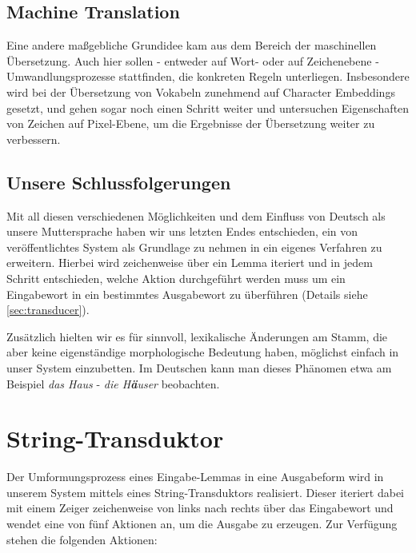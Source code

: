 \documentclass[a4paper]{article}
\begin{document}
\subsection{Machine Translation}
Eine andere maßgebliche Grundidee kam aus dem Bereich der maschinellen Übersetzung. Auch hier sollen - entweder auf Wort- oder auf Zeichenebene - Umwandlungsprozesse stattfinden, die konkreten Regeln unterliegen. Insbesondere wird bei der Übersetzung von Vokabeln zunehmend auf Character Embeddings gesetzt, und \citet{cjk-mt:LiuLLN17} gehen sogar noch einen Schritt weiter und untersuchen Eigenschaften von Zeichen auf Pixel-Ebene, um die Ergebnisse der Übersetzung weiter zu verbessern.

\subsection{Unsere Schlussfolgerungen}
Mit all diesen verschiedenen Möglichkeiten und dem Einfluss von Deutsch als unsere Muttersprache haben wir uns letzten Endes entschieden, ein von \citet{cluzh:MakarovRC17} veröffentlichtes System als Grundlage zu nehmen in ein eigenes Verfahren zu erweitern.
Hierbei wird zeichenweise über ein Lemma iteriert und in jedem Schritt entschieden, welche Aktion durchgeführt werden muss um ein Eingabewort in ein bestimmtes Ausgabewort zu überführen (Details siehe \autoref{sec:transducer}).

Zusätzlich hielten wir es für sinnvoll, lexikalische Änderungen am Stamm, die aber keine eigenständige morphologische Bedeutung haben, möglichst einfach in unser System einzubetten.
Im Deutschen kann man dieses Phänomen etwa am Beispiel \textit{das Haus} - \textit{die H\textbf{ä}user} beobachten.

\section{String-Transduktor}
\label{sec:transducer}

Der Umformungsprozess eines Eingabe-Lemmas in eine Ausgabeform wird in unserem System mittels eines String-Transduktors realisiert. Dieser iteriert dabei mit einem Zeiger zeichenweise von links nach rechts über das Eingabewort und wendet eine von fünf Aktionen an, um die Ausgabe zu erzeugen. Zur Verfügung stehen die folgenden Aktionen:
\end{document}
